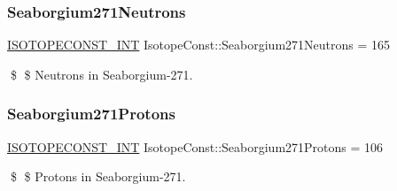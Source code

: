 \subsubsection{\texorpdfstring{Seaborgium271\+Neutrons}{Seaborgium271Neutrons}}
{\footnotesize\ttfamily \mbox{\hyperlink{group___isotope_const-_macros_ga5f18360b3e99483a35c32d789e62621c}{I\+S\+O\+T\+O\+P\+E\+C\+O\+N\+S\+T\+\_\+\+I\+NT}} Isotope\+Const\+::\+Seaborgium271\+Neutrons = 165}

\$ \$ Neutrons in Seaborgium-\/271. \mbox{\label{group___isotope_const-_seaborgium-_sg271_gab7953a42c9d14cec167334691e7638a5}} 
\subsubsection{\texorpdfstring{Seaborgium271\+Protons}{Seaborgium271Protons}}
{\footnotesize\ttfamily \mbox{\hyperlink{group___isotope_const-_macros_ga5f18360b3e99483a35c32d789e62621c}{I\+S\+O\+T\+O\+P\+E\+C\+O\+N\+S\+T\+\_\+\+I\+NT}} Isotope\+Const\+::\+Seaborgium271\+Protons = 106}

\$ \$ Protons in Seaborgium-\/271. 